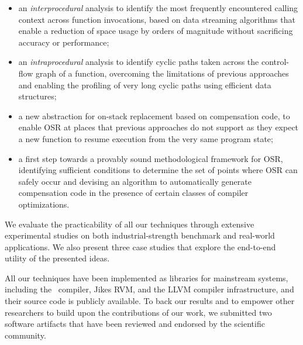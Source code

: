 \begin{itemize}
 \item an {\em interprocedural} analysis to identify the most frequently encountered calling context across function invocations, based on data streaming algorithms that enable a reduction of space usage by orders of magnitude without sacrificing accuracy or performance;
 \item an {\em intraprocedural} analysis to identify cyclic paths taken across the control-flow graph of a function, overcoming the limitations of previous approaches and enabling the profiling of very long cyclic paths using efficient data structures;
 \item a new abstraction for on-stack replacement based on compensation code, to enable OSR at places that previous approaches do not support as they expect a new function to resume execution from the very same program state;
 \item a first step towards a provably sound methodological framework for OSR, identifying sufficient conditions to determine the set of points where OSR can safely occur and devising an algorithm to automatically generate compensation code in the presence of certain classes of compiler optimizations.
\end{itemize}

\noindent We evaluate the practicability of all our techniques through extensive experimental studies on both industrial-strength benchmark and real-world applications. We also present three case studies that explore the end-to-end utility of the presented ideas. 

All our techniques have been implemented as libraries for mainstream systems, including the \gcc\ compiler, Jikes RVM, and the LLVM compiler infrastructure, and their source code is publicly available. To back our results and to empower other researchers to build upon the contributions of our work, we submitted two software artifacts that have been reviewed and endorsed by the scientific community.



